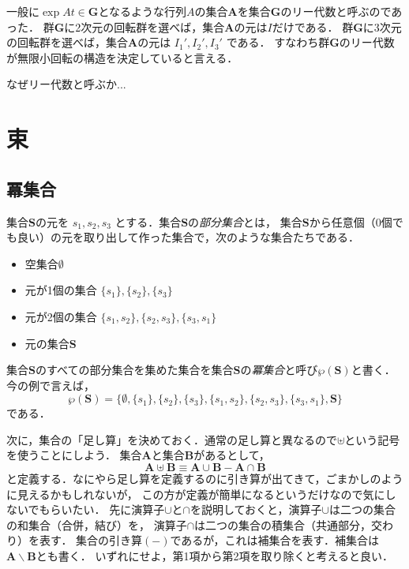 \documentclass{jsbook}
\newcommand{\keyword}[1]{\emph{#1}}
\newcommand{\bg}[1]{\mathbf{#1}}
\begin{document}
一般に$\exp At\in\bg{G}$となるような行列$A$の集合$\bg{A}$を集合$\bg{G}$のリー代数と呼ぶのであった．
群$\bg{G}$に2次元の回転群を選べば，集合$\bg{A}$の元は$I$だけである．
群$\bg{G}$に3次元の回転群を選べば，集合$\bg{A}$の元は $I_1',I_2',I_3'$ である．
すなわち群$\bg{G}$のリー代数が無限小回転の構造を決定していると言える．

なぜリー代数と呼ぶか...


\chapter{束}

\section{冪集合}

集合$\bg{S}$の元を $s_1,s_2,s_3$ とする．集合$\bg{S}$の\keyword{部分集合}とは，
集合$\bg{S}$から任意個（0個でも良い）の元を取り出して作った集合で，次のような集合たちである．
\begin{itemize}
\item 空集合$\emptyset$
\item 元が1個の集合 $\{s_1\},\{s_2\},\{s_3\}$
\item 元が2個の集合 $\{s_1,s_2\},\{s_2,s_3\},\{s_3,s_1\}$
\item 元の集合$\bg{S}$
\end{itemize}
集合$\bg{S}$のすべての部分集合を集めた集合を集合$\bg{S}$の\keyword{冪集合}と呼び$\wp(\bg{S})$と書く．
今の例で言えば，
\begin{equation}
\wp(\bg{S})=\{\emptyset,\{s_1\},\{s_2\},\{s_3\},\{s_1,s_2\},\{s_2,s_3\},\{s_3,s_1\},\bg{S}\}
\end{equation}
である．

次に，集合の「足し算」を決めておく．通常の足し算と異なるので$\uplus$という記号を使うことにしよう．
集合$\bg{A}$と集合$\bg{B}$があるとして，
\begin{equation}
\bg{A}\uplus\bg{B}\equiv\bg{A}\cup\bg{B}-\bg{A}\cap\bg{B}
\end{equation}
と定義する．なにやら足し算を定義するのに引き算が出てきて，ごまかしのように見えるかもしれないが，
この方が定義が簡単になるというだけなので気にしないでもらいたい．
先に演算子$\cup$と$\cap$を説明しておくと，演算子$\cup$は二つの集合の和集合（合併，結び）を，
演算子$\cap$は二つの集合の積集合（共通部分，交わり）を表す．
集合の引き算$(-)$であるが，これは補集合を表す．補集合は$\bg{A}\backslash\bg{B}$とも書く．
いずれにせよ，第1項から第2項を取り除くと考えると良い．
\end{document}

